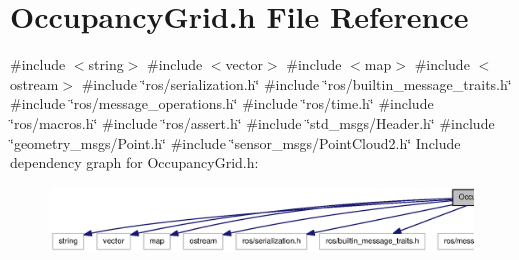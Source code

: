 \section{\-Occupancy\-Grid.\-h \-File \-Reference}
\label{OccupancyGrid_8h}
{\ttfamily \#include $<$string$>$}\*
{\ttfamily \#include $<$vector$>$}\*
{\ttfamily \#include $<$map$>$}\*
{\ttfamily \#include $<$ostream$>$}\*
{\ttfamily \#include \char`\"{}ros/serialization.\-h\char`\"{}}\*
{\ttfamily \#include \char`\"{}ros/builtin\-\_\-message\-\_\-traits.\-h\char`\"{}}\*
{\ttfamily \#include \char`\"{}ros/message\-\_\-operations.\-h\char`\"{}}\*
{\ttfamily \#include \char`\"{}ros/time.\-h\char`\"{}}\*
{\ttfamily \#include \char`\"{}ros/macros.\-h\char`\"{}}\*
{\ttfamily \#include \char`\"{}ros/assert.\-h\char`\"{}}\*
{\ttfamily \#include \char`\"{}std\-\_\-msgs/\-Header.\-h\char`\"{}}\*
{\ttfamily \#include \char`\"{}geometry\-\_\-msgs/\-Point.\-h\char`\"{}}\*
{\ttfamily \#include \char`\"{}sensor\-\_\-msgs/\-Point\-Cloud2.\-h\char`\"{}}\*
\-Include dependency graph for \-Occupancy\-Grid.\-h\-:
\nopagebreak
\begin{figure}[H]
\begin{center}
\leavevmode
\includegraphics[width=350pt]{OccupancyGrid_8h__incl}
\end{center}
\end{figure}
